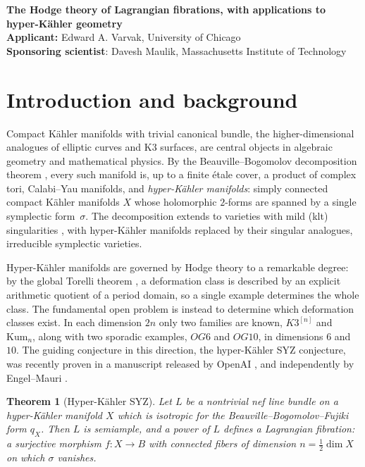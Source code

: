 \documentclass[11pt]{article}
\newcommand{\Kum}{\mathrm{Kum}}
\theoremstyle{compact}
\newtheorem*{theorem*}{Theorem}
\newcommand{\projecttitle}{The Hodge theory of Lagrangian fibrations, 
with applications to hyper-K\"ahler geometry}
\begin{document}
\begin{center}
  {\Large\bfseries \projecttitle}\\[5pt]
  {\bf Applicant: }Edward A. Varvak, University of Chicago \\ 
  {\bf Sponsoring scientist}: Davesh Maulik, Massachusetts Institute of Technology
\end{center}

\section{Introduction and background}

Compact K\"ahler manifolds with trivial canonical bundle, the higher-dimensional
analogues of elliptic curves and K3 surfaces, are central objects in algebraic geometry
and mathematical physics. By the Beauville--Bogomolov decomposition theorem
\cite{beauville83,bogomolov74}, every such manifold is, up to a finite \'etale cover, a
product of complex tori, Calabi--Yau manifolds, and \emph{hyper-K\"ahler manifolds}:
simply connected compact K\"ahler manifolds $X$ whose holomorphic $2$-forms are spanned by
a single symplectic form~$\sigma$. The decomposition extends to varieties with mild (klt)
singularities \cite{bgl22}, with hyper-K\"ahler manifolds replaced by their singular
analogues, irreducible symplectic varieties.

Hyper-K\"ahler manifolds are governed by Hodge theory to a remarkable degree: by the global
Torelli theorem \cite{verbitsky13}, a deformation class is described by an explicit
arithmetic quotient of a period domain, so a single example determines the whole class.
The fundamental open problem is instead to determine which deformation classes
exist. In each dimension $2n$ only two families are known, $K3^{[n]}$ and $\Kum_n$, along
with two sporadic examples, $OG6$ and $OG10$, in dimensions $6$ and $10$. The guiding
conjecture in this direction, the hyper-K\"ahler SYZ conjecture, was recently proven in a
manuscript released by OpenAI \cite{openai-syz26}, and independently by Engel--Mauri
\cite{engel-mauri26}.

\begin{theorem*}[Hyper-K\"ahler SYZ]
Let $L$ be a nontrivial nef line bundle on a hyper-K\"ahler manifold $X$ which is isotropic
for the Beauville--Bogomolov--Fujiki form $q_X$. Then $L$ is semiample, and a power of $L$
defines a \emph{Lagrangian fibration}: a surjective morphism $f\colon X\to B$ with connected
fibers of dimension $n=\frac12\dim X$ on which $\sigma$ vanishes.
\end{theorem*}
\end{document}
